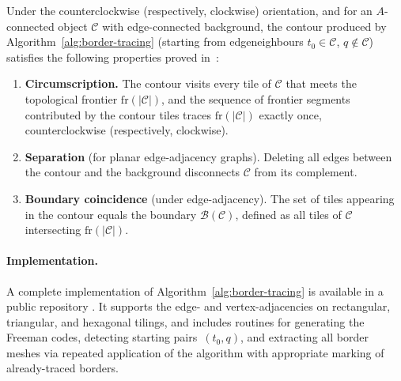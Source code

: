 Under the counterclockwise (respectively, clockwise) orientation, and for an $A$-connected object $\mathcal{C}$ with edge-connected background, the contour produced by Algorithm~\ref{alg:border-tracing} (starting from edge\-neigh\-bours $t_0 \in \mathcal{C}$, $q \notin \mathcal{C}$) satisfies the following properties proved in~\cite{WiederholdMatosWiederhold2026}:
\begin{enumerate}
    \item \textbf{Circumscription.}
    The contour visits every tile of $\mathcal{C}$ that meets the topological frontier $\mathrm{fr}(|\mathcal{C}|)$, and the sequence of frontier segments contributed by the contour tiles traces $\mathrm{fr}(|\mathcal{C}|)$ exactly once, counterclockwise (respectively, clockwise).

    \item \textbf{Separation} (for planar edge-adjacency graphs).
    Deleting all edges between the contour and the background disconnects $\mathcal{C}$ from its complement.
    
    \item \textbf{Boundary coincidence} (under edge-adjacency).
    The set of tiles appearing in the contour equals the boundary $\mathcal{B}(\mathcal{C})$, defined as all tiles of $\mathcal{C}$ intersecting $\mathrm{fr}(|\mathcal{C}|)$.
\end{enumerate}

\paragraph{Implementation.}
A complete implementation of Algorithm~\ref{alg:border-tracing} is available in a public repository \cite{wiederhold2026border_repo}.
It supports the edge- and vertex-adjacencies on rectangular, triangular, and hexagonal tilings, and includes routines for generating the Freeman codes, detecting starting pairs~$(t_0, q)$, and extracting all border meshes via repeated application of the algorithm with appropriate marking of already-traced borders.